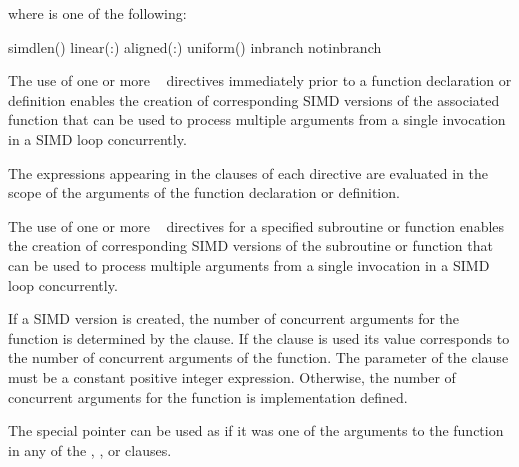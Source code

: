 \begin{fortranspecific}

where  is one of the following:
\begin{indentedcodelist}
simdlen()
linear(\plc{linear-list[ }:\plc{ linear-step]})
aligned(\plc{argument-list[ }:\plc{ alignment]})
uniform()
inbranch
notinbranch
\end{indentedcodelist}
\end{fortranspecific}

\descr
\begin{ccppspecific}
The use of one or more ~ directives immediately prior
to a function declaration or definition enables the creation of corresponding 
SIMD versions of the associated function that can be used to process multiple 
arguments from a single invocation in a SIMD loop concurrently.

The expressions appearing in the clauses of each directive are evaluated in 
the scope of the arguments of the function declaration or definition.
\end{ccppspecific}

\begin{samepage}
\begin{fortranspecific}
The use of one or more ~ directives for a specified
subroutine or function enables the creation of corresponding SIMD versions of the
subroutine or function that can be used to process multiple arguments from a
single invocation in a SIMD loop concurrently.
\end{fortranspecific}
\end{samepage}

If a SIMD version is created, the number of concurrent arguments for the 
function is determined by the  clause. If the  
clause is used its value corresponds to the number of concurrent arguments 
of the function. The parameter of the  clause must be a constant 
positive integer expression. Otherwise, the number of concurrent arguments 
for the function is implementation defined.

\begin{cppspecific}
The special  pointer can be used as if it was one of the arguments to 
the function in any of the , , or  clauses.
\end{cppspecific}

